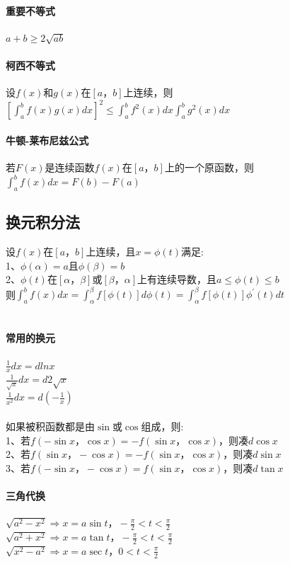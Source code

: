 \documentclass{article}
\begin{document}
\begin{flushleft}
	\paragraph{重要不等式}
	$a+b\ge 2\sqrt{ab}$\\
	\paragraph{柯西不等式}
	设$f(x)$和$g(x)$在$[a，b]$上连续，则$[\int_{a}^{b}f(x)g(x)dx]^2\le \int_{a}^{b}f^2(x)dx\int_{a}^{b}g^2(x)dx$\\
	\paragraph{牛顿-莱布尼兹公式}
	若$F(x)$是连续函数$f(x)$在$[a，b]$上的一个原函数，则$\int_{a}^{b}f(x)dx=F(b)-F(a)$\\
	
	\subsection{换元积分法}
	
	设$f(x)$在$[a，b]$上连续，且$x=\phi(t)$满足:\\
	1、$\phi(\alpha)=a$且$\phi(\beta)=b$\\
	2、$\phi(t)$在$[\alpha，\beta]$或$[\beta，\alpha]$上有连续导数，且$a\le \phi(t)\le b$\\
	则$\int_{a}^{b}f(x)dx=\int_{\alpha}^{\beta}f[\phi(t)]d\phi(t)=\int_{\alpha}^{\beta}f[\phi(t)]\phi^{'}(t)dt$\\
	~\\
	\paragraph{常用的换元}
	$\frac{1}{x}dx=dlnx$\\
	$\frac{1}{\sqrt{x}}dx=d2\sqrt{x}$\\
	$\frac{1}{x^2}dx=d(-\frac{1}{x})$\\
	~\\
	如果被积函数都是由$\sin$或$\cos$组成，则:\\
	1、若$f(-\sin x，\cos x)=-f(\sin x，\cos x)$，则凑$d\cos x$\\
	2、若$f(\sin x，-\cos x)=-f(\sin x，\cos x)$，则凑$d\sin x$\\
	3、若$f(-\sin x，-\cos x)=f(\sin x，\cos x)$，则凑$d\tan x$\\
	\paragraph{三角代换}
	$\sqrt{a^2-x^2} \Rightarrow x=a\sin t， -\frac{\pi}{2}<t<\frac{\pi}{2}$\\
	$\sqrt{a^2+x^2} \Rightarrow x=a\tan t， -\frac{\pi}{2}<t<\frac{\pi}{2}$\\
	$\sqrt{x^2-a^2} \Rightarrow x=a\sec t， 0<t<\frac{\pi}{2}$\\

\end{flushleft}
\end{document}
